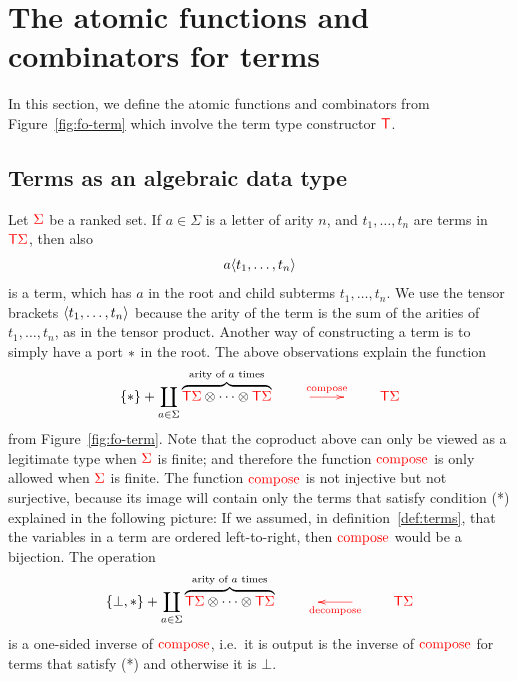
\section{The atomic functions and combinators for terms}
\label{sec:atomic-and-combinators}
In this section, we define the atomic functions and combinators from Figure~\ref{fig:fo-term} which involve the term type constructor ${\color{red}{\mathsf T}}$. 





\subsection{Terms as an algebraic data type} Let ${\color{red}{\Sigma}}$ be a ranked set. If $a \in \Sigma$ is a letter of arity $n$, and $t_1,\ldots,t_n$ are terms in ${\color{red}{\mathsf T}} {\color{red}{\Sigma}}$, then also 
\begin{align*}
    a \langle{t_1,\ldots,t_n}\rangle
\end{align*}
is a term, which has $a$ in the root and child subterms $t_1,\ldots,t_n$. We use the tensor brackets $\langle{t_1,\ldots,t_n}\rangle$ because the arity of the term is the sum of the arities of $t_1,\ldots,t_n$, as in the tensor product. Another way of constructing a term is to simply have a port $*$ in the root. The above observations explain the function 
\begin{align*}     
    \set * + \coprod_{a \in \Sigma} \overbrace{\tmonad \rSigma \otimes \cdots \otimes \tmonad \rSigma}^{\text{arity of $a$ times}}   \qquad \ranked{\xymatrix{
        \ar[r]^{\composeterm}& 
    }} \qquad \tmonad \rSigma
\end{align*}
from Figure~\ref{fig:fo-term}. Note that the coproduct above can only be viewed as a legitimate type when ${\color{red}{\Sigma}}$ is finite; and therefore the function ${\color{red}{\mathrm{compose}}}$ is only allowed when ${\color{red}{\Sigma}}$ is finite. The function ${\color{red}{\mathrm{compose}}}$ is not injective but not surjective, because its image will contain only the terms that satisfy condition (*) explained in the following picture: 
If we assumed, in definition~\ref{def:terms}, that the variables in a term are ordered left-to-right, then ${\color{red}{\mathrm{compose}}}$ would be a bijection. The operation 
\begin{align*}     
    \set {\bot,*} + \coprod_{a \in \Sigma} \overbrace{\tmonad \rSigma \otimes \cdots \otimes \tmonad \rSigma}^{\text{arity of $a$ times}}   \qquad \ranked{\xymatrix{
&          \ar[l]^{\decomposeterm} 
    }} \qquad \tmonad \rSigma
\end{align*}
is a one-sided inverse of ${\color{red}{\mathrm{compose}}}$, i.e.~it is output is the inverse of ${\color{red}{\mathrm{compose}}}$ for terms that satisfy (*) and otherwise it is $\bot$. 


